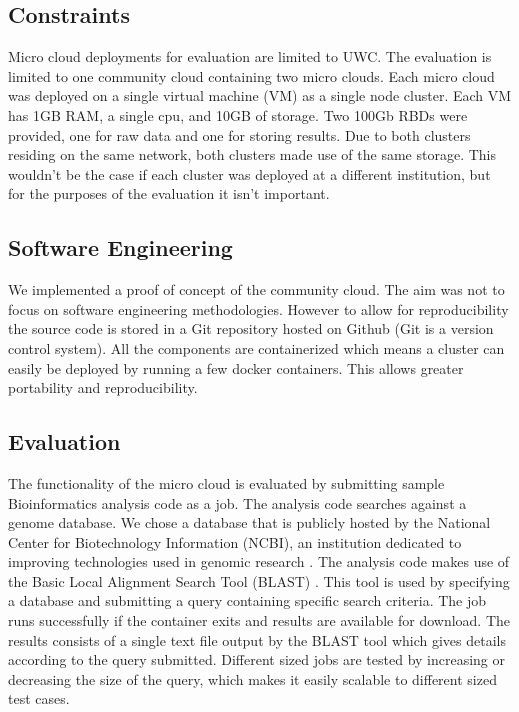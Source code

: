 \documentclass{sig-alternate-05-2015}
\begin{document}
\subsection{Constraints}
Micro cloud deployments for evaluation are limited to UWC. The evaluation is limited to one community cloud containing two micro clouds. Each micro cloud was deployed on a single virtual machine (VM) as a single node cluster. Each VM has 1GB RAM, a single cpu, and 10GB of storage. Two 100Gb RBDs were provided, one for raw data and one for storing results. Due to both clusters residing on the same network, both clusters made use of the same storage. This wouldn't be the case if each cluster was deployed at a different institution, but for the purposes of the evaluation it isn't important.

\subsection{Software Engineering}

We implemented a proof of concept of the community cloud. The aim was not to focus on software engineering methodologies. However to allow for reproducibility the source code is stored in a Git repository hosted on Github (Git is a version control system). All the components are containerized which means a cluster can easily be deployed by running a few docker containers. This allows greater portability and reproducibility. 




\subsection{Evaluation}
The functionality of the micro cloud is evaluated by submitting sample Bioinformatics analysis code as a job. The analysis code searches against a genome database. We chose a database that is publicly hosted by the National Center for Biotechnology Information (NCBI), an institution dedicated to improving technologies used in genomic research \cite{pruitt2005ncbi}. The analysis code makes use of the Basic Local Alignment Search Tool (BLAST) \cite{camacho2009blast}. This tool is used by specifying a database and submitting a query containing specific search criteria. The job runs successfully if the container exits and results are available for download. The results consists of a single text file output by the BLAST tool which gives details according to the query submitted. Different sized jobs are tested by increasing or decreasing the size of the query, which makes it easily scalable to different sized test cases.
\end{document}
